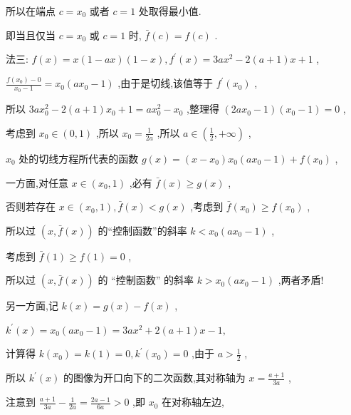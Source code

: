\documentclass[10pt]{article}
\begin{document}
所以在端点 \(c = {x}_{0}\) 或者 \(c = 1\) 处取得最小值.

即当且仅当 \(c = {x}_{0}\) 或 \(c = 1\) 时, \(\bar{f}\left( c\right)  = f\left( c\right)\) .

法三: \(f\left( x\right)  = x\left( {1 - {ax}}\right) \left( {1 - x}\right) ,{f}^{\prime }\left( x\right)  = {3a}{x}^{2} - 2\left( {a + 1}\right) x + 1\) ,

\(\frac{f\left( {x}_{0}\right)  - 0}{{x}_{0} - 1} = {x}_{0}\left( {a{x}_{0} - 1}\right)\) ,由于是切线,该值等于 \({f}^{\prime }\left( {x}_{0}\right)\) ,

所以 \({3a}{x}_{0}^{2} - 2\left( {a + 1}\right) {x}_{0} + 1 = a{x}_{0}^{2} - {x}_{0}\) ,整理得 \(\left( {{2a}{x}_{0} - 1}\right) \left( {{x}_{0} - 1}\right)  = 0\) ,

考虑到 \({x}_{0} \in  \left( {0,1}\right)\) ,所以 \({x}_{0} = \frac{1}{2a}\) ,所以 \(a \in  \left( {\frac{1}{2}, + \infty }\right)\) ,

\({x}_{0}\) 处的切线方程所代表的函数 \(g\left( x\right)  = \left( {x - {x}_{0}}\right) {x}_{0}\left( {a{x}_{0} - 1}\right)  + f\left( {x}_{0}\right)\) ,

一方面,对任意 \(x \in  \left( {{x}_{0},1}\right)\) ,必有 \(\bar{f}\left( x\right)  \geq  g\left( x\right)\) ,

否则若存在 \(x \in  \left( {{x}_{0},1}\right) ,\bar{f}\left( x\right)  < g\left( x\right)\) ,考虑到 \(\bar{f}\left( {x}_{0}\right)  \geq  f\left( {x}_{0}\right)\) ,

所以过 \(\left( {x,\bar{f}\left( x\right) }\right)\) 的“控制函数”的斜率 \(k < {x}_{0}\left( {a{x}_{0} - 1}\right)\) ,

考虑到 \(\bar{f}\left( 1\right)  \geq  f\left( 1\right)  = 0\) ,

所以过 \(\left( {x,\bar{f}\left( x\right) }\right)\) 的 “控制函数” 的斜率 \(k > {x}_{0}\left( {a{x}_{0} - 1}\right)\) ,两者矛盾!

另一方面,记 \(k\left( x\right)  = g\left( x\right)  - f\left( x\right)\) ,

\({k}^{\prime }\left( x\right)  = {x}_{0}\left( {a{x}_{0} - 1}\right)  = {3a}{x}^{2} + 2\left( {a + 1}\right) x - 1,\)

计算得 \(k\left( {x}_{0}\right)  = k\left( 1\right)  = 0,{k}^{\prime }\left( {x}_{0}\right)  = 0\) ,由于 \(a > \frac{1}{2}\) ,

所以 \({k}^{\prime }\left( x\right)\) 的图像为开口向下的二次函数,其对称轴为 \(x = \frac{a + 1}{3a}\) ,

注意到 \(\frac{a + 1}{3a} - \frac{1}{2a} = \frac{{2a} - 1}{6a} > 0\) ,即 \({x}_{0}\) 在对称轴左边,
\end{document}
